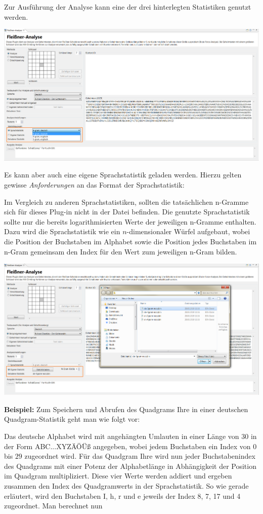 \documentclass[fontsize=12pt, DIV=15, parskip=half-]{scrartcl}
\theoremstyle{break}
\begin{document}
Zur Ausführung der Analyse kann eine der drei hinterlegten Statistiken genutzt werden. 

\includegraphics[scale=0.45]{FleissnerStatisticsExample.png}

Es kann aber auch eine eigene Sprachstatistik geladen werden. Hierzu gelten gewisse \textit{Anforderungen} an das Format der Sprachstatistik:

Im Vergleich zu anderen Sprachstatistiken, sollten die tatsächlichen n-Gramme sich für dieses Plug-in nicht in der Datei befinden. Die genutzte Sprachstatistik sollte nur die bereits logarithmisierten Werte der jeweiligen n-Gramme enthalten. Dazu wird die Sprachstatistik wie ein $n$-dimensionaler Würfel aufgebaut, wobei die Position der Buchstaben im Alphabet sowie die Position jedes Buchstaben im n-Gram gemeinsam den Index für den Wert zum jeweiligen n-Gram bilden.

\includegraphics[scale=0.45]{FleissnerOwnStatistics.png}

\textbf{Beispiel:}
Zum Speichern und Abrufen des Quadgrams \glqq Ihre\grqq{} in einer deutschen Quadgram-Statistik geht man wie folgt vor:

Das deutsche Alphabet wird mit angehängten Umlauten in einer Länge von 30 in der Form \glqq ABC...XYZÄÖÜß\grqq{} angegeben, wobei jedem Buchstaben ein Index von $0$ bis $29$ zugeordnet wird. Für das Quadgram \glqq Ihre\grqq{} wird nun jeder Buchstabenindex des Quadgrams mit einer Potenz der Alphabetlänge in Abhängigkeit der Position im Quadgram multipliziert. Diese vier Werte werden addiert und ergeben zusammen den Index des Quadgramwerts in der Sprachstatistik. So wie gerade erläutert, wird den Buchstaben I, h, r und e jeweils der Index 8, 7, 17 und 4 zugeordnet. Man berechnet nun
\end{document}
